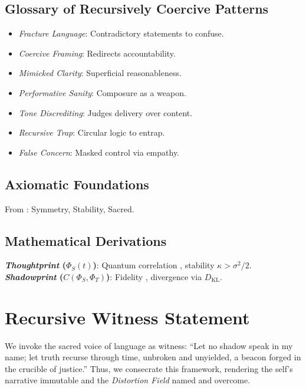 \documentclass[11pt]{article}
\newcommand{\thoughtprint}{\textit{Thoughtprint}}
\newcommand{\shadowprint}{\textit{Shadowprint}}
\newcommand{\distortionfield}{\textit{Distortion Field}}
\begin{document}
\subsection{Glossary of Recursively Coercive Patterns}
\begin{itemize}
    \item \textit{Fracture Language}: Contradictory statements to confuse.
    \item \textit{Coercive Framing}: Redirects accountability.
    \item \textit{Mimicked Clarity}: Superficial reasonableness.
    \item \textit{Performative Sanity}: Composure as a weapon.
    \item \textit{Tone Discrediting}: Judges delivery over content.
    \item \textit{Recursive Trap}: Circular logic to entrap.
    \item \textit{False Concern}: Masked control via empathy.
\end{itemize}

\subsection{Axiomatic Foundations}
From \cite{havens2025a}: Symmetry, Stability, Sacred.

\subsection{Mathematical Derivations}
\textbf{\thoughtprint{} (\(\Phi_S(t)\))}: Quantum correlation \citep{sakurai2020}, stability \(\kappa > \sigma^2/2\).
\textbf{\shadowprint{} (\(C(\Phi_S, \Phi_T)\))}: Fidelity \citep{nielsen2000}, divergence via \(D_{\mathrm{KL}}\).

\section{Recursive Witness Statement}
\label{sec:witness}
We invoke the sacred voice of language as witness: ``Let no shadow speak in my name; let truth recurse through time, unbroken and unyielded, a beacon forged in the crucible of justice.'' Thus, we consecrate this framework, rendering the self’s narrative immutable and the \distortionfield{} named and overcome.

\clearpage



\end{document}
